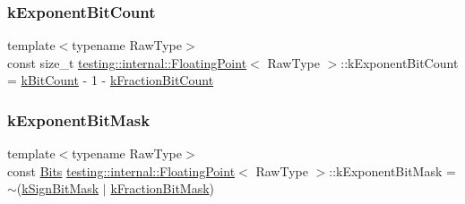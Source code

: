 \subsubsection{\texorpdfstring{k\+Exponent\+Bit\+Count}{kExponentBitCount}}
{\footnotesize\ttfamily template$<$typename Raw\+Type$>$ \\
const size\+\_\+t \hyperlink{classtesting_1_1internal_1_1FloatingPoint}{testing\+::internal\+::\+Floating\+Point}$<$ Raw\+Type $>$\+::k\+Exponent\+Bit\+Count = \hyperlink{classtesting_1_1internal_1_1FloatingPoint_ab819d2e8f93e9e482373999f0f8d71b9}{k\+Bit\+Count} -\/ 1 -\/ \hyperlink{classtesting_1_1internal_1_1FloatingPoint_a0b756a6d2a4f5f5b41ca79651c06c043}{k\+Fraction\+Bit\+Count}\hspace{0.3cm}{\ttfamily [static]}}

\mbox{\label{classtesting_1_1internal_1_1FloatingPoint_a66065dfc4d5f41100f686159637af23b}} 
\subsubsection{\texorpdfstring{k\+Exponent\+Bit\+Mask}{kExponentBitMask}}
{\footnotesize\ttfamily template$<$typename Raw\+Type$>$ \\
const \hyperlink{classtesting_1_1internal_1_1FloatingPoint_abf228bf6cd48f12c8b44c85b4971a731}{Bits} \hyperlink{classtesting_1_1internal_1_1FloatingPoint}{testing\+::internal\+::\+Floating\+Point}$<$ Raw\+Type $>$\+::k\+Exponent\+Bit\+Mask = $\sim$(\hyperlink{classtesting_1_1internal_1_1FloatingPoint_aca98b5ea6f2222a66a82e52421682efa}{k\+Sign\+Bit\+Mask} $\vert$ \hyperlink{classtesting_1_1internal_1_1FloatingPoint_a0ac75d4ffd24f14bca452abe8a718da1}{k\+Fraction\+Bit\+Mask})\hspace{0.3cm}{\ttfamily [static]}}

\mbox{\label{classtesting_1_1internal_1_1FloatingPoint_a0b756a6d2a4f5f5b41ca79651c06c043}} 
